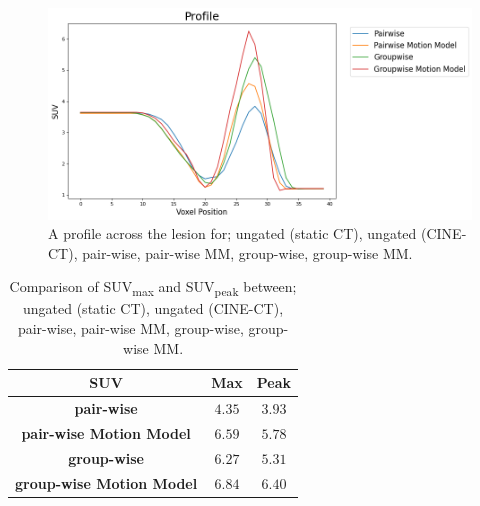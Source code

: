     \begin{figure}
        \vspace{-0.4cm}
        \centering
        
        \includegraphics[width=1.0\linewidth]{figures/profile.png}
        
        \vspace{-0.4cm}
        
        \captionsetup{singlelinecheck=false, justification=centering}
        \caption{A profile across the lesion for; ungated (static \gls{CT}), ungated (CINE-\gls{CT}), pair-wise, pair-wise \gls{MM}, group-wise, group-wise \gls{MM}.}
        
        \label{fig:profile}
        \vspace{-0.4cm}
    \end{figure}
    
    \begin{table}
        \centering
        
        \captionsetup{singlelinecheck=false, justification=centering}
        \caption{Comparison of \gls{SUV}\textsubscript{max} and \gls{SUV}\textsubscript{peak} between; ungated (static \gls{CT}), ungated (CINE-\gls{CT}), pair-wise, pair-wise \gls{MM}, group-wise, group-wise \gls{MM}.}
        
        \resizebox*{0.8\linewidth}{!}
        {
            \begin{tabular}{||c|cc||}
                \hline
                \textbf{\gls{SUV}}              & \textbf{Max}  & \textbf{Peak} \\
                \hline
                \textbf{pair-wise}               & $4.35$        & $3.93$ \\
                \textbf{pair-wise Motion Model}  & $6.59$        & $5.78$ \\
                \textbf{group-wise}              & $6.27$        & $5.31$ \\
                \textbf{group-wise Motion Model} & $6.84$        & $6.40$ \\
                \hline
            \end{tabular}
        }
        
        \label{tab:suv}
        \vspace{-0.4cm}
    \end{table}
    
